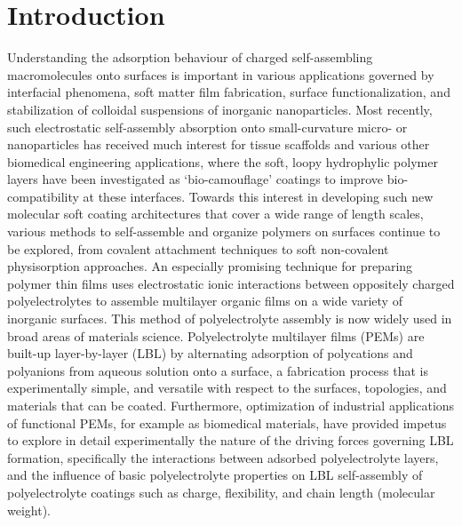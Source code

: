 \documentclass[twoside,twocolumn,9pt]{article}
\begin{document}
\section{Introduction}   %
    \label{sec-intro}
Understanding the adsorption behaviour of charged self-assembling macromolecules onto surfaces is important in various applications governed by interfacial phenomena, soft matter film fabrication, surface functionalization, and stabilization of colloidal suspensions of inorganic nanoparticles.\cite{Dorris2011}  Most recently, such electrostatic self-assembly absorption onto small-curvature micro- or nanoparticles has received much interest for tissue scaffolds and various other biomedical engineering applications, where the soft, loopy hydrophylic polymer layers have been investigated as `bio-camouflage' coatings to improve bio-compatibility at these interfaces.\cite{Landry2019} 
Towards this interest in developing such new molecular soft coating architectures that cover a wide range of length scales, various methods to self-assemble and organize polymers on surfaces continue to be explored, from covalent attachment techniques\cite{doi:10.1002/ijch.199600050,B210143M,doi:10.1002/masy.200450305} to soft non-covalent physisorption approaches.\cite{Chen1992,Serizawa2002} An especially promising technique for preparing polymer thin films uses electrostatic ionic interactions between oppositely charged polyelectrolytes to assemble multilayer organic films on a wide variety of inorganic surfaces.  This method of polyelectrolyte assembly is now widely used in broad areas of materials science.\cite{Decher1997}  
Polyelectrolyte multilayer films (PEMs) are built-up layer-by-layer (LBL) by alternating adsorption of polycations and polyanions from aqueous solution onto a surface,\cite{Decher2006} a fabrication process that is experimentally simple, and versatile with respect to the surfaces, topologies, and materials that can be coated.  
Furthermore, optimization of industrial applications of functional PEMs, for example as biomedical materials, have provided impetus to explore in detail experimentally the nature of the driving forces governing LBL formation, specifically the interactions between adsorbed polyelectrolyte layers, and the influence of basic polyelectrolyte properties on LBL self-assembly of polyelectrolyte coatings such as charge, flexibility, and chain length (molecular weight).
\end{document}
